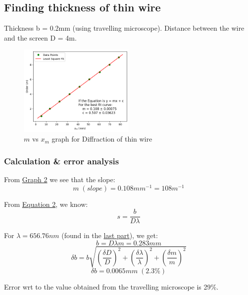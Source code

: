     \subsection{Finding thickness of thin wire}
        Thickness b = 0.2mm (using travelling microscope). Distance between the wire and the screen D = 4m.



        

        \begin{figure}[H]
            \centering
            \includegraphics[width=0.5\textwidth]{images/graph_2.png}
            \caption{$m$ vs $x_m$ graph for Diffraction of thin wire}
            \label{graph:2}
        \end{figure}

        \subsubsection{Calculation \& error analysis}
            From \hyperref[graph:2]{Graph 2} we see that the slope:
            $$m\;(slope) = 0.108 mm^{-1} = 108 m^{-1}$$

            From \hyperref[eqn:2]{Equation 2}, we know:
            $$s = \frac{b}{D\lambda}$$

            For $\lambda = 656.76 nm$ (found in the \hyperref[ans:1]{last part}), we get:
            $$b = D\lambda m = 0.283mm$$
            $$\delta b = b\sqrt{\left(\frac{\delta D}{D}\right)^2 + \left(\frac{\delta \lambda}{\lambda}\right)^2 + \left(\frac{\delta m}{m}\right)^2}$$
            $$\delta b = 0.0065mm\;(2.3\%)$$

            \begin{center}
                \label{ans:2}
            \end{center}

            Error wrt to the value obtained from the travelling microscope is 29\%.

